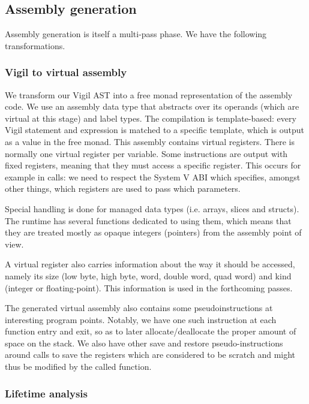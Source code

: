 \documentclass[letterpaper,11pt]{article}
\begin{document}
\subsection{Assembly generation}
\label{sec:ph_gen}

Assembly generation is itself a multi-pass phase. We have the following transformations.

\subsubsection{Vigil to virtual assembly}
\label{sec:vasm}

We transform our Vigil AST into a free monad representation of the assembly code. We use an assembly data type that abstracts over its operands (which are virtual at this stage) and label types. The compilation is template-based: every Vigil statement and expression is matched to a specific template, which is output as a value in the free monad. This assembly contains virtual registers. There is normally one virtual register per variable. Some instructions are output with fixed registers, meaning that they must access a specific register. This occurs for example in calls: we need to respect the System V ABI which specifies, amongst other things, which registers are used to pass which parameters.

Special handling is done for managed data types (i.e. arrays, slices and structs). The runtime has several functions dedicated to using them, which means that they are treated mostly as opaque integers (pointers) from the assembly point of view.

A virtual register also carries information about the way it should be accessed, namely its size (low byte, high byte, word, double word, quad word) and kind (integer or floating-point). This information is used in the forthcoming passes.

The generated virtual assembly also contains some pseudoinstructions at interesting program points. Notably, we have one such instruction at each function entry and exit, so as to later allocate/deallocate the proper amount of space on the stack. We also have other save and restore pseudo-instructions around calls to save the registers which are considered to be scratch and might thus be modified by the called function.

\subsubsection{Lifetime analysis}
\end{document}
